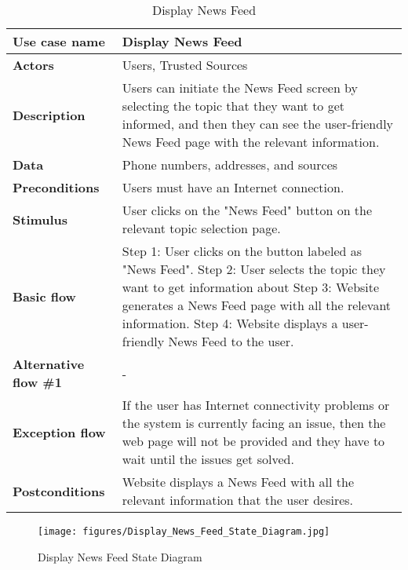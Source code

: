 \documentclass[listof=nochaptergap]{report}
\begin{document}
    \begin{table}[H]
        \centering
         \begin{tabular}{| p{4cm} | p{10cm} |} 
         \hline
         \textbf{Use case name} & Display News Feed \\
         \hline
         \textbf{Actors} & Users, Trusted Sources \\
         \hline
         \textbf{Description} & Users can initiate the News Feed screen by selecting the topic that they want to get informed, and then they can see the user-friendly News Feed page with the relevant information.  \\
         \hline
         \textbf{Data} & Phone numbers, addresses, and sources \\
         \hline
         \textbf{Preconditions} & Users must have an Internet connection. \\
         \hline
         \textbf{Stimulus} & User clicks on the "News Feed" button on the relevant topic selection page. \\
         \hline
         \textbf{Basic flow} & Step 1: User clicks on the button labeled as "News Feed". \newline Step 2: User selects the topic they want to get information about \newline Step 3: Website generates a News Feed page with all the relevant information. \newline Step 4: Website displays a user-friendly News Feed to the user. \\
         \hline
         \textbf{Alternative flow \#1} & - \\
         \hline
         \textbf{Exception flow} & If the user has Internet connectivity problems or the system is currently facing an issue, then the web page will not be provided and they have to wait until the issues get solved. \\
         \hline
         \textbf{Postconditions} & Website displays a News Feed with all the relevant information that the user desires. \\
         \hline
         \end{tabular}
        \caption{Display News Feed}
        \label{tab:table17}
    \end{table}

        \begin{center}
            \begin{figure}[H]
                \centering
                \texttt{[image: figures/Display\_News\_Feed\_State\_Diagram.jpg]}
                \caption{Display News Feed State Diagram} 
                \label{fig:figure1}
            \end{figure}
        \end{center}
\end{document}
